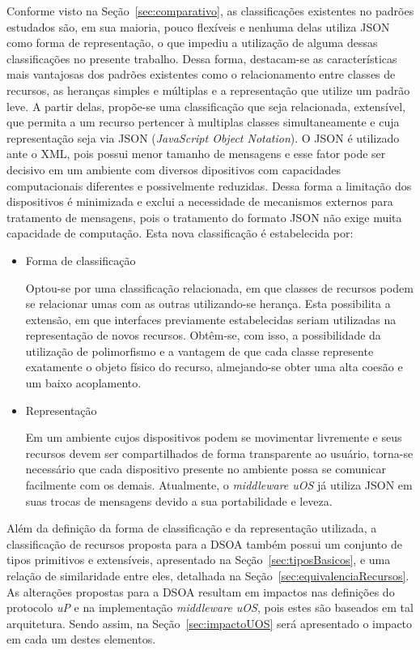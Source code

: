 Conforme visto na Seção~\ref{sec:comparativo}, as classificações existentes no padrões estudados são, em sua maioria, pouco flexíveis e nenhuma delas utiliza JSON como forma de representação, o que impediu a utilização de alguma dessas classificações no presente trabalho. Dessa forma, destacam-se as características mais vantajosas dos padrões existentes como o relacionamento entre classes de recursos, as heranças simples e múltiplas e a representação que utilize um padrão leve. A partir delas, propõe-se uma classificação que seja relacionada, extensível, que permita a um recurso pertencer à multiplas classes simultaneamente e cuja representação seja via JSON (\emph{JavaScript Object Notation}). O JSON é utilizado ante o XML, pois possui menor tamanho de mensagens e esse fator pode ser decisivo em um ambiente com diversos dipositivos com capacidades computacionais diferentes e possivelmente reduzidas. Dessa forma a limitação dos dispositivos é minimizada e exclui a necessidade de mecanismos externos para tratamento de mensagens, pois o tratamento do formato JSON não exige muita capacidade de computação. Esta nova classificação é estabelecida por:

\begin{itemize}
	\item Forma de classificação

	Optou-se por uma classificação relacionada, em que classes de recursos podem se relacionar umas com as outras utilizando-se herança. Esta possibilita a extensão, em que interfaces previamente estabelecidas seriam utilizadas na representação de novos recursos. Obtêm-se, com isso, a possibilidade da utilização de polimorfismo e a vantagem de que cada classe represente exatamente o objeto físico do recurso, almejando-se obter uma alta coesão e um baixo acoplamento.

	\item Representação

	Em um ambiente cujos dispositivos podem se movimentar livremente e seus recursos devem ser compartilhados de forma transparente ao usuário, torna-se necessário que cada dispositivo presente no ambiente possa se comunicar facilmente com os demais. Atualmente, o \emph{middleware uOS} já utiliza JSON em suas trocas de mensagens devido a sua portabilidade e leveza.
\end{itemize}

Além da definição da forma de classificação e da representação utilizada, a classificação de recursos proposta para a DSOA também possui um conjunto de tipos primitivos e extensíveis, apresentado na Seção~\ref{sec:tiposBasicos}, e uma relação de similaridade entre eles, detalhada na Seção~\ref{sec:equivalenciaRecursos}. As alterações propostas para a DSOA resultam em impactos nas definições do protocolo \emph{uP} e na implementação \emph{middleware uOS}, pois estes são baseados em tal arquitetura. Sendo assim, na Seção~\ref{sec:impactoUOS} será apresentado o impacto em cada um destes elementos.

